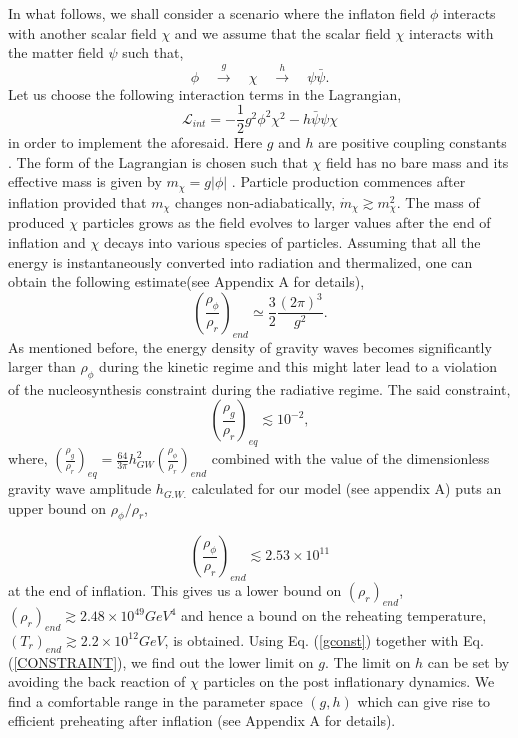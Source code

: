 \documentclass[prd,twocolumn,superscriptaddress]{revtex4}
\begin{document}
 In what follows, we shall consider a scenario where
the inflaton field $\phi$ interacts with another scalar field $\chi$ and we assume that the scalar
field $\chi$ interacts with the matter field  $\psi$ such that\cite{Campos1},
\begin{equation}
\phi \quad \xrightarrow{g} \quad \chi \quad \xrightarrow{h} \quad \psi \bar{\psi}.
\end{equation}
 Let us choose the following interaction terms in the  Lagrangian,
\begin{equation}
\label{Lint}
\mathscr{L}_{int} = - \frac{1}{2} g^2 \phi^2 \chi^2 - h \bar{\psi} \psi \chi
\end{equation}
in order to implement the aforesaid. Here $g$ and $h$ are positive coupling constants \cite{SamiDadich,InstantPreheating,FermionPreheating,VariableGravity,ala}. The form of the 
Lagrangian is chosen such that $\chi$ field has no bare mass and its effective mass is given by
$m_{\chi} = g \left| \phi \right|$ \cite{InstantPreheating2}. Particle production commences after 
inflation provided that $m_\chi$ changes non-adiabatically, $\dot{m}_\chi\gtrsim m^2_\chi$. The mass
of produced $\chi$ particles grows as the field evolves to larger values after the end of inflation
and $\chi$ decays into various species of particles. Assuming that all the energy is instantaneously 
converted into radiation and thermalized, one can obtain the following estimate(see Appendix A for details),
\begin{equation}
\label{gconst}
{\left( \frac{\rho_{\phi}}{\rho_r} \right)}_{end} \simeq \frac{3}{2} \frac{(2 \pi)^3}{g^2}.
\end{equation}
As mentioned before, the energy density of gravity waves  becomes significantly larger than $\rho_\phi$ during the kinetic 
regime and this might later lead to a violation of the nucleosynthesis constraint during the radiative regime. The said constraint,
\begin{equation}
 \left(\frac{\rho_g}{\rho_r}\right)_{eq}\lesssim 10^{-2},
\end{equation}
where, $\left(\frac{\rho_g}{\rho_r}\right)_{eq}
 = \frac{64}{3 \pi} h_{GW}^2 \left(\frac{\rho_{\phi}}{\rho_r}\right)_{end}$ combined with the value of the dimensionless
 gravity wave amplitude $h_{G.W.}$ calculated for our model (see appendix A) 
puts an upper bound on $\rho_\phi/\rho_{r}$,

\begin{equation}
 \left(\frac{\rho_{\phi}}{\rho_r}\right)_{end} \lesssim 2.53 \times 10^{11} \label{CONSTRAINT}
\end{equation}
at the end of inflation. This gives us a lower bound on $(\rho_r)_{end}$, $(\rho_r)_{end} \gtrsim 2.48 \times 10^{49} GeV^4$ 
and hence a bound on the reheating temperature, $(T_r)_{end} \gtrsim 2.2 \times 10^{12} GeV$, is obtained. Using
 Eq. (\ref{gconst}) together with Eq. (\ref{CONSTRAINT}), we find out the lower limit on $g$. The limit on $h$ can be 
 set by avoiding the back reaction of $\chi$ particles on the post inflationary 
dynamics. We find a comfortable range in the parameter space $(g,h)$ which can give rise to  efficient preheating 
after inflation (see Appendix A for details).
\end{document}
